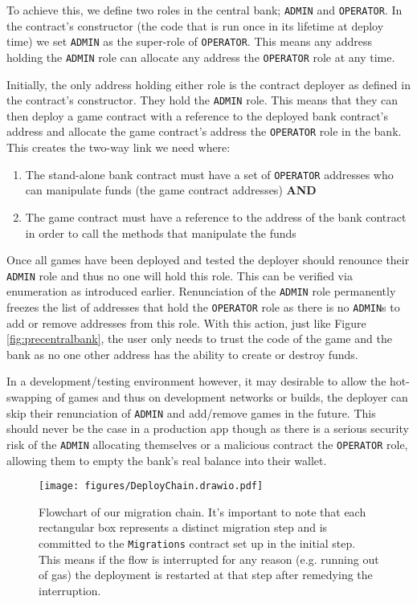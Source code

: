 \documentclass[10pt,journal,compsoc]{IEEEtran}
\begin{document}
To achieve this, we define two roles in the central bank; \texttt{ADMIN} and \texttt{OPERATOR}. In the contract's constructor (the code that is run once in its lifetime at deploy time) we set \texttt{ADMIN} as the super-role of \texttt{OPERATOR}. This means any address holding the \texttt{ADMIN} role can allocate any address the \texttt{OPERATOR} role at any time. 

Initially, the only address holding either role is the contract deployer as defined in the contract's constructor. They hold the \texttt{ADMIN} role. This means that they can then deploy a game contract with a reference to the deployed bank contract's address and allocate the game contract's address the \texttt{OPERATOR} role in the bank. This creates the two-way link we need where:
\begin{enumerate}
    \item The stand-alone bank contract must have a set of \texttt{OPERATOR} addresses who can manipulate funds (the game contract addresses) \textbf{AND}
    \item The game contract must have a reference to the address of the bank contract in order to call the methods that manipulate the funds
\end{enumerate}

Once all games have been deployed and tested the deployer should renounce their \texttt{ADMIN} role and thus no one will hold this role. This can be verified via enumeration as introduced earlier. Renunciation of the \texttt{ADMIN} role permanently freezes the list of addresses that hold the \texttt{OPERATOR} role as there is no  \texttt{ADMIN}s to add or remove addresses from this role. With this action, just like Figure \ref{fig:precentralbank}, the user only needs to trust the code of the game and the bank as no one other address has the ability to create or destroy funds.

In a development/testing environment however, it may desirable to allow the hot-swapping of games and thus on development networks or builds, the deployer can skip their renunciation of \texttt{ADMIN} and add/remove games in the future. This should never be the case in a production app though as there is a serious security risk of the \texttt{ADMIN} allocating themselves or a malicious contract the \texttt{OPERATOR} role, allowing them to empty the bank's real balance into their wallet.

\begin{figure}[!h]
    \centering
    \texttt{[image: figures/DeployChain.drawio.pdf]}
    \caption{Flowchart of our migration chain. It's important to note that each rectangular box represents a distinct migration step and is committed to the \texttt{Migrations} contract set up in the initial step. This means if the flow is interrupted for any reason (e.g. running out of gas) the deployment is restarted at that step after remedying the interruption.}
    \label{fig:deploychain}
\end{figure}
\end{document}
